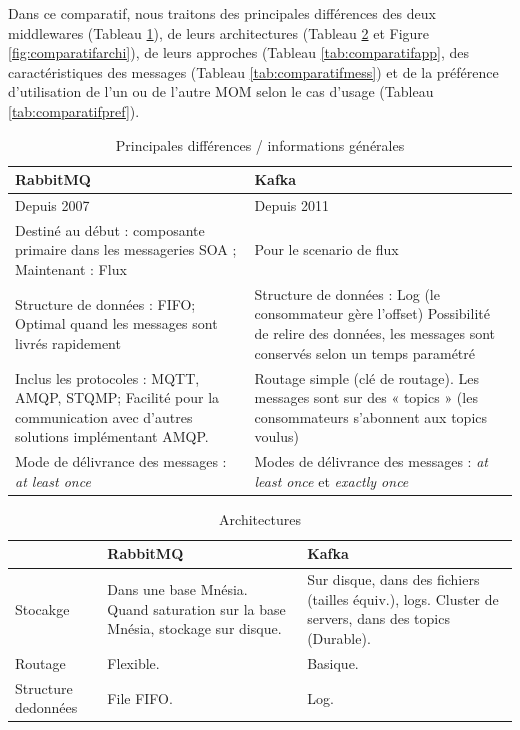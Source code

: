 \documentclass{article}
\begin{document}
			Dans ce comparatif, nous traitons des principales différences des deux middlewares (Tableau \ref{tab:comparatifinfos}), de leurs architectures (Tableau \ref{tab:comparatifarchi} et Figure \ref{fig:comparatifarchi}), de leurs approches (Tableau \ref{tab:comparatifapp}, des caractéristiques des messages (Tableau \ref{tab:comparatifmess}) et de la préférence d'utilisation de l'un ou de l'autre MOM selon le cas d'usage (Tableau \ref{tab:comparatifpref}).
			\begin{table}[hp]
				\begin{tabular}{|p{7.5cm}|p{7.5cm}|}
					\hline
					\rowcolor{lightgray} RabbitMQ & Kafka\\\hline
					Depuis 2007 & Depuis 2011\\\hline
					Destiné au début : composante primaire dans les messageries SOA ; Maintenant : Flux & Pour le scenario de flux\\\hline
					Structure de données : FIFO; Optimal quand les messages sont livrés rapidement & Structure de données : Log (le consommateur gère l’offset) Possibilité de relire des données, les messages sont conservés selon un temps paramétré\\\hline
					Inclus les protocoles : MQTT, AMQP, STQMP; Facilité pour la communication avec d’autres solutions implémentant AMQP. & Routage simple (clé de routage). Les messages sont sur des « topics » (les consommateurs s’abonnent aux topics voulus)\\\hline
					Mode de délivrance des messages : \textit{at least once} & Modes de délivrance des messages : \textit{at least once} et \textit{exactly once}\\\hline
				\end{tabular}
				\caption{Principales différences / informations générales}
				\label{tab:comparatifinfos}
			\end{table}
			\medskip
			\begin{table}[hp]
				\begin{tabular}{|p{3cm}|p{6cm}|p{6cm}|}
					\hline
					\rowcolor{lightgray} & RabbitMQ & Kafka\\\hline
					Stocakge & Dans une base Mnésia. Quand saturation sur la base Mnésia, stockage sur disque. & Sur disque, dans des fichiers (tailles équiv.), logs. Cluster de servers, dans des topics (Durable). \\\hline
					Routage & Flexible. & Basique.\\\hline
					Structure de\newline données & File FIFO. & Log.\\\hline
				\end{tabular}
				\caption{Architectures}
				\label{tab:comparatifarchi}
			\end{table}
\end{document}
